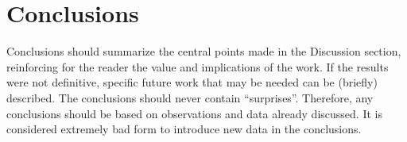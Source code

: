 \section{Conclusions}
Conclusions should summarize the central points made in the Discussion section, reinforcing for the reader the value and implications of the work. If the results were not definitive, specific future work that may be needed can be (briefly) described. The conclusions should never contain ``surprises''. Therefore, any conclusions should be based on observations and data already discussed. It is considered extremely bad form to introduce new data in the conclusions.



